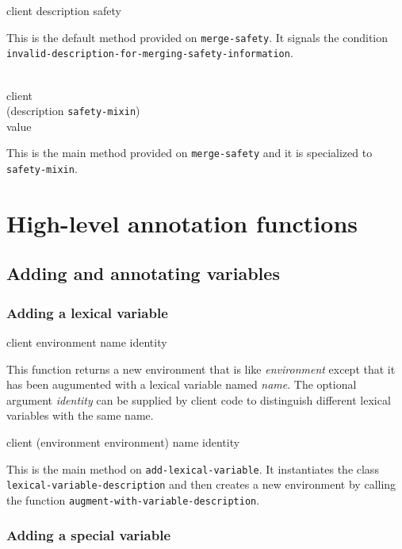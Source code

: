 {\footnotesize
{} {client description safety}
}

This is the default method provided on \texttt{merge-safety}.  It
signals the condition
\texttt{invalid-description-for-merging-safety-information}.

{\footnotesize
{}\\
           {client\\
            (description {\tt safety-mixin})\\
            value}
}

This is the main method provided on \texttt{merge-safety} and it is
specialized to \texttt{safety-mixin}.

\section{High-level annotation functions}

\subsection{Adding and annotating variables}

\subsubsection{Adding a lexical variable}

{\footnotesize
{} {client environment name \optional identity}
}

This function returns a new environment that is like
\textit{environment} except that it has been augumented with a lexical
variable named \textit{name}.  The optional argument \textit{identity}
can be supplied by client code to distinguish different lexical
variables with the same name.

{\footnotesize
{}
{client
 (environment environment)
 name
 \optional identity}
}

This is the main method on \texttt{add-lexical-variable}.  It
instantiates the class \texttt{lexical-variable-description} and then
creates a new environment by calling the function
\texttt{augment-with-variable-description}.

\subsubsection{Adding a special variable}

